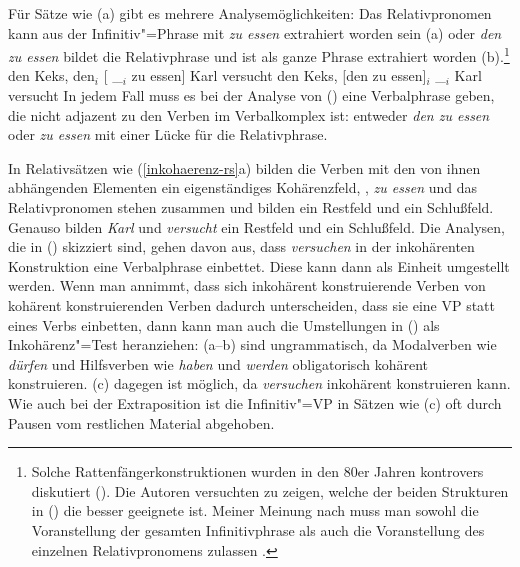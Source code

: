 Für Sätze wie (a) gibt es mehrere Analysemöglichkeiten: Das Relativpronomen kann aus der
Infinitiv"=Phrase mit \emph{zu essen} extrahiert worden sein (a)
oder \emph{den zu essen} bildet die Relativphrase und ist als ganze Phrase extrahiert 
worden (b).\footnote{
  Solche Rattenfängerkonstruktionen wurden in den 80er Jahren kontrovers diskutiert
  (\citealp*{Riemsdijk85,Haider85c,Grewendorf86,Trissler88,Riemsdijk94}). Die Autoren
  versuchten zu zeigen, welche der beiden Strukturen in () die besser geeignete ist.
  Meiner Meinung nach muss man sowohl die Voranstellung der gesamten Infinitivphrase
  als auch die Voranstellung des einzelnen Relativpronomens zulassen \citep[Kapitel~10.7]{Mueller99a}.
}
\eal
\ex den Keks, den$_i$ [ \_$_i$ zu essen] Karl versucht
\ex den Keks, [den zu essen]$_i$ \_$_i$ Karl versucht
\zl
In jedem Fall muss es bei der Analyse von () eine Verbalphrase
geben, die nicht adjazent zu den Verben im Verbalkomplex ist: entweder \emph{den zu essen} oder
\emph{zu essen} mit einer Lücke für die Relativphrase.

In Relativsätzen wie (\ref{inkohaerenz-rs}a) bilden die Verben mit den von ihnen abhängenden Elementen ein
eigenständiges Kohärenzfeld, \dash, \emph{zu essen} und das Relativpronomen stehen zusammen
und bilden ein Restfeld und ein Schlußfeld. Genauso bilden \emph{Karl} und \emph{versucht} ein
Restfeld und ein Schlußfeld. Die Analysen, die in () skizziert sind, gehen davon aus, dass
\emph{versuchen} in der inkohärenten Konstruktion eine Verbalphrase einbettet. Diese kann dann als
Einheit umgestellt werden. Wenn man annimmt, dass sich inkohärent konstruierende Verben von
kohärent konstruierenden Verben dadurch unterscheiden, dass sie eine VP statt eines Verbs einbetten, dann kann man
auch die Umstellungen in () als Inkohärenz"=Test heranziehen:
(a--b) sind ungrammatisch, da Modalverben wie \emph{dürfen} und Hilfsverben wie
\emph{haben} und \emph{werden} obligatorisch kohärent konstruieren. 
(c) dagegen ist möglich, da \emph{versuchen} inkohärent konstruieren kann.
\eal
{}
\zl
Wie auch bei der Extraposition ist die Infinitiv"=VP in Sätzen wie (c) oft
durch Pausen vom restlichen Material abgehoben.%

